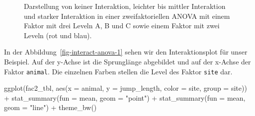 \documentclass[
  letterpaper,
  DIV=11,
  oneside]{scrreport}
\newenvironment{Shaded}{\begin{snugshade}}{\end{snugshade}}
\newcommand{\AttributeTok}[1]{\textcolor[rgb]{0.40,0.45,0.13}{#1}}
\newcommand{\FunctionTok}[1]{\textcolor[rgb]{0.28,0.35,0.67}{#1}}
\newcommand{\NormalTok}[1]{\textcolor[rgb]{0.00,0.23,0.31}{#1}}
\newcommand{\SpecialCharTok}[1]{\textcolor[rgb]{0.37,0.37,0.37}{#1}}
\newcommand{\StringTok}[1]{\textcolor[rgb]{0.13,0.47,0.30}{#1}}
\begin{document}
\begin{figure}
\begin{minipage}[t]{0.33\linewidth}
{{}

}

\end{minipage}%

\caption{\label{fig-anova-inter-example}Darstellung von keiner
Interaktion, leichter bis mittler Interaktion und starker Interaktion in
einer zweifaktoriellen ANOVA mit einem Faktor mit drei Leveln A, B und C
sowie einem Faktor mit zwei Leveln (rot und blau).}

\end{figure}

In der Abbildung~\ref{fig-interact-anova-1} sehen wir den
Interaktionsplot für unser Beispiel. Auf der y-Achse ist die Sprunglänge
abgebildet und auf der x-Achse der Faktor \texttt{animal}. Die einzelnen
Farben stellen die Level des Faktor \texttt{site} dar.

\begin{Shaded}
\begin{Highlighting}[]
\FunctionTok{ggplot}\NormalTok{(fac2\_tbl, }\FunctionTok{aes}\NormalTok{(}\AttributeTok{x =}\NormalTok{ animal, }\AttributeTok{y =}\NormalTok{ jump\_length,}
                     \AttributeTok{color =}\NormalTok{ site, }\AttributeTok{group =}\NormalTok{ site)) }\SpecialCharTok{+}
  \FunctionTok{stat\_summary}\NormalTok{(}\AttributeTok{fun =}\NormalTok{ mean, }\AttributeTok{geom =} \StringTok{"point"}\NormalTok{) }\SpecialCharTok{+}
  \FunctionTok{stat\_summary}\NormalTok{(}\AttributeTok{fun =}\NormalTok{ mean, }\AttributeTok{geom =} \StringTok{"line"}\NormalTok{) }\SpecialCharTok{+}
  \FunctionTok{theme\_bw}\NormalTok{()}
\end{Highlighting}
\end{Shaded}
\end{document}
